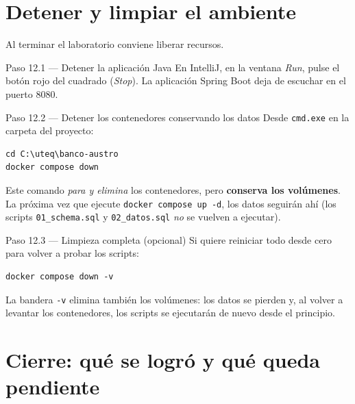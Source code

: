 \documentclass[11pt,a4paper]{article}
\begin{document}
\section{Detener y limpiar el ambiente}

Al terminar el laboratorio conviene liberar recursos.

\begin{pasobox}{Paso 12.1 --- Detener la aplicaci\'on Java}
En IntelliJ, en la ventana \emph{Run}, pulse el bot\'on rojo del cuadrado (\emph{Stop}). La aplicaci\'on Spring Boot deja de escuchar en el puerto 8080.
\end{pasobox}

\begin{pasobox}{Paso 12.2 --- Detener los contenedores conservando los datos}
Desde \texttt{cmd.exe} en la carpeta del proyecto:

\begin{lstlisting}[style=bashstyle]
cd C:\uteq\banco-austro
docker compose down
\end{lstlisting}

Este comando \emph{para y elimina} los contenedores, pero \textbf{conserva los vol\'umenes}. La pr\'oxima vez que ejecute \texttt{docker compose up -d}, los datos seguir\'an ah\'i (los scripts \texttt{01\_schema.sql} y \texttt{02\_datos.sql} \emph{no} se vuelven a ejecutar).
\end{pasobox}

\begin{pasobox}{Paso 12.3 --- Limpieza completa (opcional)}
Si quiere reiniciar todo desde cero para volver a probar los scripts:

\begin{lstlisting}[style=bashstyle]
docker compose down -v
\end{lstlisting}

La bandera \texttt{-v} elimina tambi\'en los vol\'umenes: los datos se pierden y, al volver a levantar los contenedores, los scripts se ejecutar\'an de nuevo desde el principio.
\end{pasobox}

\clearpage
\section{Cierre: qu\'e se logr\'o y qu\'e queda pendiente}
\end{document}
